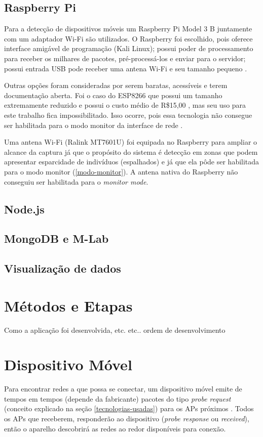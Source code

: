 \subsection{Raspberry Pi}
Para a detecção de dispositivos móveis um Raspberry Pi Model 3 B juntamente com um adaptador Wi-Fi são utilizados. O Raspberry foi escolhido,
pois oferece interface amigável de programação (Kali Linux); possui poder de processamento para receber os milhares de pacotes, pré-processá-los
e enviar para o servidor; possui entrada USB pode receber uma antena Wi-Fi e seu tamanho pequeno \cite{rpi2017}.

Outras opções foram consideradas por serem baratas, acessíveis e terem documentação aberta. Foi o caso do ESP8266 que possui um tamanho extremamente
reduzido e possui o custo médio de R\$15,00 \cite{Embarcados2015}, mas seu uso para este trabalho fica impossibilitado. Isso
ocorre, pois essa tecnologia não consegue ser habilitada para o modo monitor da interface de rede \cite{Puhl2016} \cite{Ferreira2016}.

Uma antena Wi-Fi (Ralink MT7601U) foi equipada no Raspberry para ampliar o alcance da captura já que o propósito do sistema é detecção em zonas que podem
apresentar esparcidade de indivíduos (espalhados) e já que ela pôde ser habilitada para o modo monitor (\autoref{modo-monitor}). A antena nativa
do Raspberry não conseguiu ser habilitada para o \emph{monitor mode}.

\subsection{Node.js}

\subsection{MongoDB e M-Lab}

\subsection{Visualização de dados}

\section{Métodos e Etapas}
Como a aplicação foi desenvolvida, etc. etc.. ordem de desenvolvimento


\section{Dispositivo Móvel}
\label{smartphone-probe}
Para encontrar redes a que possa se conectar, um dispositivo móvel emite de tempos em tempos (depende da fabricante) pacotes do tipo \emph{probe request} (conceito explicado na seção \autoref{tecnologias-usadas}) para os APs próximos \cite{Meraki}. Todos os APs que receberem, responderão ao dispositivo (\emph{probe response} ou \emph{received}), então o aparelho descobrirá as redes ao redor disponíveis para conexão.



